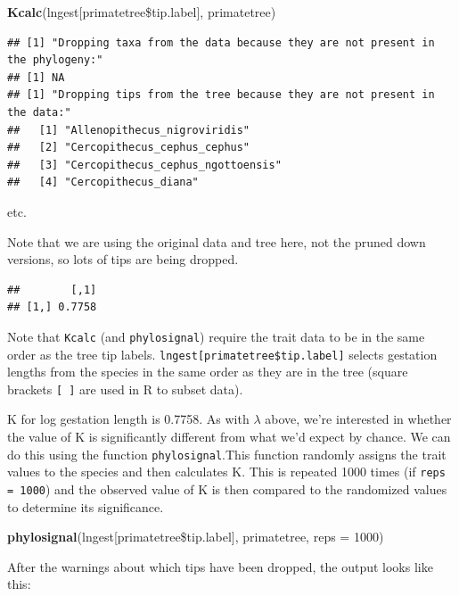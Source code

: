 \documentclass[12pt]{article}
\newcommand{\KeywordTok}[1]{\textcolor[rgb]{0.13,0.29,0.53}{\textbf{{#1}}}}
\newcommand{\DataTypeTok}[1]{\textcolor[rgb]{0.13,0.29,0.53}{{#1}}}
\newcommand{\DecValTok}[1]{\textcolor[rgb]{0.00,0.00,0.81}{{#1}}}
\newcommand{\NormalTok}[1]{{#1}}
\begin{document}
\begin{snugshade}
\begin{Highlighting}[]
\KeywordTok{Kcalc}\NormalTok{(lngest[primatetree\$tip.label], primatetree)}
\end{Highlighting}
\end{snugshade}

\begin{verbatim}
## [1] "Dropping taxa from the data because they are not present in the phylogeny:"
## [1] NA
## [1] "Dropping tips from the tree because they are not present in the data:"
##   [1] "Allenopithecus_nigroviridis"                  
##   [2] "Cercopithecus_cephus_cephus"                  
##   [3] "Cercopithecus_cephus_ngottoensis"             
##   [4] "Cercopithecus_diana"
\end{verbatim}

etc.

Note that we are using the original data and tree here, not the pruned down versions, so lots of tips are being dropped.

\begin{verbatim}
##        [,1]
## [1,] 0.7758
\end{verbatim}

Note that \texttt{Kcalc} (and \texttt{phylosignal}) require the trait data to be in the same order as the tree tip labels. \texttt{lngest[primatetree\$tip.label]} selects gestation lengths from the species in the same order as they are in the tree (square brackets \texttt{[ ]} are used in R to subset data).

K for log gestation length is 0.7758. As with $\lambda$ above, we’re interested in whether the value of K is significantly different from what we’d expect by chance. We can do this using the function \texttt{phylosignal}.This function randomly assigns the trait values to the species and then calculates K. This is repeated 1000 times (if \texttt{reps = 1000}) and the observed value of K is then compared to the randomized values to determine its significance.

\begin{snugshade}
\begin{Highlighting}[]
\KeywordTok{phylosignal}\NormalTok{(lngest[primatetree\$tip.label], primatetree, }\DataTypeTok{reps =} \DecValTok{1000}\NormalTok{)}
\end{Highlighting}
\end{snugshade}

After the warnings about which tips have been dropped, the output looks like this:
\end{document}
